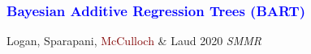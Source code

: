 \documentclass[11pt,dvipsnames,usenames,times]{beamer}
\begin{document}
\begin{frame}
\boldmath
\frametitle{\bf\textcolor{blue}{Bayesian Additive Regression Trees (BART)}}
\textcolor{PineGreen}{Logan}, \textcolor{PineGreen}{Sparapani}, 
\textcolor{Maroon}{McCulloch} \& \textcolor{PineGreen}{Laud} 2020 {\it SMMR}\\
\begin{center}
\\
\vspace{-15mm}
\end{center}
\end{frame}

\end{document}
